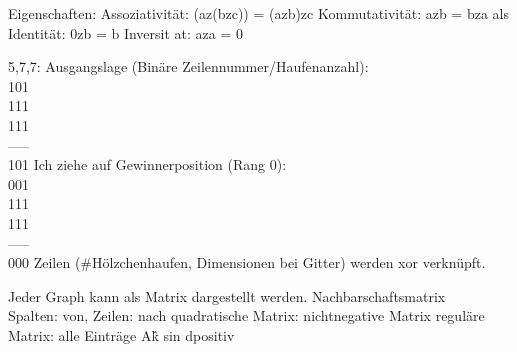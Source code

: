 \documentclass[ngerman,a4paper,12pt]{scrreprt}
\begin{document}
 Eigenschaften:
 \ul
 	\li Assoziativität: (az(bzc)) = (azb)zc
 	\li Kommutativität: azb = bza
 	 als Identität: 0zb = b
 	\li Inversit at: aza = 0
\ulE

5,7,7:
\ol
	\li Ausgangslage (Binäre Zeilennummer/Haufenanzahl): \\
		101 \\
		111 \\
		111 \\
		----- \\
		101
	\li Ich ziehe auf Gewinnerposition (Rang 0): \\
		001 \\
		111 \\
		111 \\
		-----\\
		000
\olE
Zeilen (\#Hölzchenhaufen, Dimensionen bei Gitter) werden xor verknüpft.

Jeder Graph kann als Matrix dargestellt werden. \ra Nachbarschaftsmatrix \\
Spalten: von, Zeilen: nach
\ul
	\li quadratische Matrix: nichtnegative Matrix
	\li reguläre Matrix: alle Einträge A\^k sin dpositiv
\ulE

\end{document}

